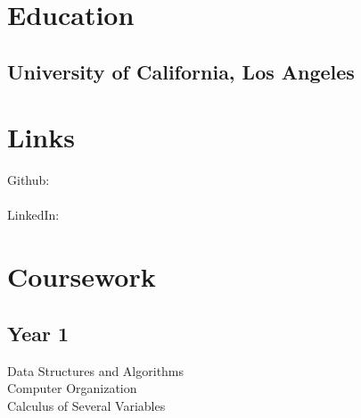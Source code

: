 \documentclass[]{deedy-resume-openfont}
\begin{document}
%
%



%
%

\begin{minipage}[t]{0.33\textwidth} 


\section{Education} 

\subsection{University of California, \newline Los Angeles}
\sectionsep


\section{Links} 
Github:\\ \href{https://github.com/ashwin9798}{} \\
LinkedIn: \href{https://www.linkedin.com/ashwin-vivekanandh-554518126}{} \\
\sectionsep


\section{Coursework}
\subsection{Year 1}
Data Structures and Algorithms \\
Computer Organization \\
Calculus of Several Variables
\sectionsep


\end{minipage}
\end{document}
